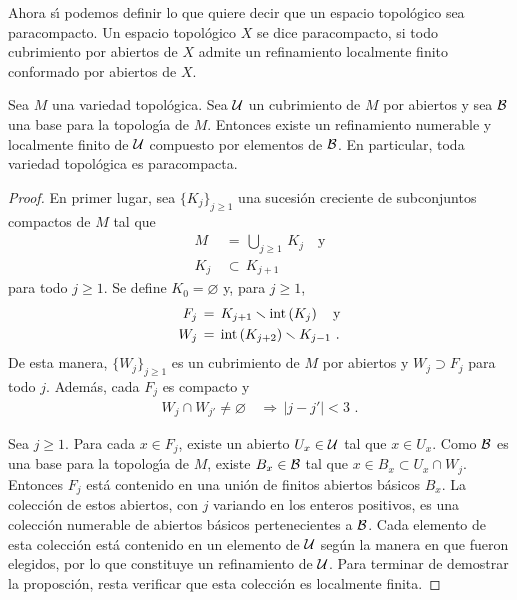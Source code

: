 Ahora s\'{\i} podemos definir lo que quiere decir que un espacio
topol\'{o}gico sea paracompacto. Un espacio topol\'{o}gico $X$ se dice
paracompacto, si todo cubrimiento por abiertos de $X$ admite un refinamiento
localmente finito conformado por abiertos de $X$.

\begin{propoVarTopParacomp}\label{thm:vartopparacomp}
	Sea $M$ una variedad topol\'{o}gica. Sea $\cal{U}$ un cubrimiento
	de $M$ por abiertos y sea $\cal{B}$ una base para la topolog\'{\i}a
	de $M$. Entonces existe un refinamiento numerable y localmente
	finito de $\cal{U}$ compuesto por elementos de $\cal{B}$.
	En particular, toda variedad topol\'{o}gica es paracompacta.
\end{propoVarTopParacomp}

\begin{proof}
	En primer lugar, sea $\{K_{j}\}_{j\geq 1}$ una sucesi\'{o}n creciente
	de subconjuntos compactos de $M$ tal que
	\begin{align*}
		M & \,=\,\bigcup_{j\geq 1}\,K_{j}\quad\text{y} \\
		K_{j} & \,\subset\, K_{j+1}
	\end{align*}
	para todo $j\geq 1$. Se define $K_{0}=\varnothing$ y, para $j\geq 1$,
	\begin{align*}
		F_{j} & \,=\,K_{j+1}\setmin\interior{K_{j}}\quad\text{y} \\
		W_{j} & \,=\,\interior{K_{j+2}}\setmin K_{j-1}
		\text{ .}
	\end{align*}
	De esta manera, $\{W_{j}\}_{j\geq 1}$ es un cubrimiento de $M$ por
	abiertos y $W_{j}\supset F_{j}$ para todo $j$. Adem\'{a}s, cada
	$F_{j}$ es compacto y
	\begin{align*}
		W_{j}\cap W_{j'}\not =\varnothing & \,\Rightarrow\,
			|j-j'|<3\text{ .}
	\end{align*}

	Sea $j\geq 1$. Para cada $x\in F_{j}$, existe un abierto
	$U_{x}\in\cal{U}$ tal que $x\in U_{x}$. Como $\cal{B}$ es una base
	para la topolog\'{\i}a de $M$, existe $B_{x}\in\cal{B}$ tal que
	$x\in B_{x}\subset U_{x}\cap W_{j}$. Entonces $F_{j}$ est\'{a}
	contenido en una uni\'{o}n de finitos abiertos b\'{a}sicos $B_{x}$.
	La colecci\'{o}n de estos abiertos, con $j$ variando en los enteros
	positivos, es una colecci\'{o}n numerable de abiertos b\'{a}sicos
	pertenecientes a $\cal{B}$. Cada elemento de esta colecci\'{o}n
	est\'{a} contenido en un elemento de $\cal{U}$ seg\'{u}n la manera
	en que fueron elegidos, por lo que constituye un refinamiento de
	$\cal{U}$. Para terminar de demostrar la proposci\'{o}n, resta
	verificar que esta colecci\'{o}n es localmente finita.


\end{proof}
